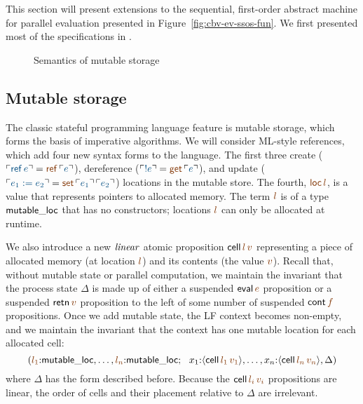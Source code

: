 This section will present extensions to the sequential, first-order
abstract machine for parallel evaluation presented in
Figure~\ref{fig:cbv-ev-ssos-fun}. We first presented 
most of the specifications in
\cite{pfenning09substructural}.

\begin{figure}[t]
\caption{Semantics of mutable storage}
\label{fig:ssos-mutable}
\end{figure}

\subsection{Mutable storage}
\label{sec:mutable-storage}

The classic stateful programming language feature is mutable storage,
which forms the basis of imperative algorithms. We will consider
ML-style references, which add four new syntax forms to the language.
The first three create ($\interp{{\sf ref}\,e} = \lf{{\sf
  ref}\,\interp{e}}$), dereference ($\interp{{!}e} = \lf{{\sf
  get}\,\interp{e}}$), and update ($\interp{e_1 := e_2} = \lf{{\sf
  set}\,\interp{e_1}\,\interp{e_2}}$) locations in the mutable
store. The fourth, $\lf{{\sf loc}\,l}$, is a value that represents pointers
to allocated memory. The term $\lf{l}$ is of a type ${\sf mutable\_loc}$
that has no constructors; locations $\lf{l}$ can only be allocated at
runtime.

We also introduce a new ${\it linear}$ atomic proposition ${\sf
  cell}\,\lf{l}\,\lf{v}$ representing a piece of allocated memory (at location
$\lf{l}$) and its contents (the value $\lf{v}$). Recall that, without mutable
state or parallel computation, we maintain the invariant that the
process state $\Delta$ is made up of either a suspended ${\sf eval}\,\lf{e}$
proposition or a suspended ${\sf retn}\,\lf{v}$ proposition to the left of
some number of suspended ${\sf cont}\,\lf{f}$ propositions. Once we add
mutable state, the LF context becomes non-empty, and we maintain the
invariant that the context has one mutable location for each allocated
cell:
\[
(\lf{l_1}{:}{\sf mutable\_loc}, \ldots, \lf{l_n}{:}{\sf mutable\_loc}; ~~
 x_1{:}\susp{{\sf cell}\,\lf{l_1}\,\lf{v_1}}, \ldots, 
 x_n{:}\susp{{\sf cell}\,\lf{l_n}\,\lf{v_n}}, 
 \Delta)
\]
where $\Delta$ has the form described before. Because the ${\sf
  cell}\,\lf{l_i}\,\lf{v_i}$ propositions are linear, the order of cells and
their placement relative to $\Delta$ are irrelevant.

